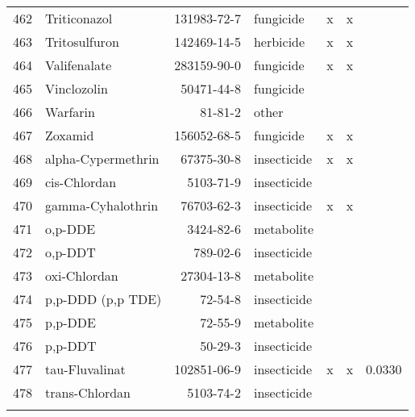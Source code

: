 \begin{longtable}{lp{4cm}rlp{1.3cm}p{1.3cm}p{1.5cm}}
  462 & Triticonazol & 131983-72-7 & fungicide & x & x &  \\ 
  463 & Tritosulfuron & 142469-14-5 & herbicide & x & x &  \\ 
  464 & Valifenalate & 283159-90-0 & fungicide & x & x &  \\ 
  465 & Vinclozolin & 50471-44-8 & fungicide &  &  &  \\ 
  466 & Warfarin & 81-81-2 & other &  &  &  \\ 
  467 & Zoxamid & 156052-68-5 & fungicide & x & x &  \\ 
  468 & alpha-Cypermethrin & 67375-30-8 & insecticide & x & x &  \\ 
  469 & cis-Chlordan & 5103-71-9 & insecticide &  &  &  \\ 
  470 & gamma-Cyhalothrin & 76703-62-3 & insecticide & x & x &  \\ 
  471 & o,p-DDE & 3424-82-6 & metabolite &  &  &  \\ 
  472 & o,p-DDT & 789-02-6 & insecticide &  &  &  \\ 
  473 & oxi-Chlordan & 27304-13-8 & metabolite &  &  &  \\ 
  474 & p,p-DDD (p,p TDE) & 72-54-8 & insecticide &  &  &  \\ 
  475 & p,p-DDE & 72-55-9 & metabolite &  &  &  \\ 
  476 & p,p-DDT & 50-29-3 & insecticide &  &  &  \\ 
  477 & tau-Fluvalinat & 102851-06-9 & insecticide & x & x & 0.0330 \\ 
  478 & trans-Chlordan & 5103-74-2 & insecticide &  &  &  \\ 
  \label{tab:phch_var}
\end{longtable}
